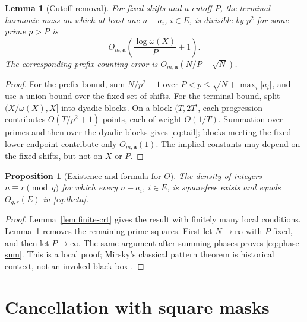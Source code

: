 \documentclass[11pt]{article}
\newtheorem{proposition}[theorem]{Proposition}
\newtheorem{lemma}[theorem]{Lemma}
\theoremstyle{definition}
\theoremstyle{remark}
\begin{document}
\begin{lemma}[Cutoff removal]
\label{lem:tail}
For fixed shifts and a cutoff \(P\), the terminal harmonic mass on which at
least one \(n-a_i\), \(i\in E\), is divisible by \(p^2\) for some prime
\(p>P\) is
\begin{equation}
 O_{m,\mathbf a}\!\left(\frac{\log\omega(X)}P+1\right).
 \label{eq:tail}
\end{equation}
The corresponding prefix counting error is
\(O_{m,\mathbf a}(N/P+\sqrt N)\).
\end{lemma}

\begin{proof}
For the prefix bound, sum \(N/p^2+1\) over
\(P<p\le\sqrt{N+\max_i|a_i|}\), and use a union bound over the fixed set
of shifts.  For the terminal bound, split \((X/\omega(X),X]\) into dyadic
blocks.  On a block \((T,2T]\), each progression contributes
\(O(T/p^2+1)\) points, each of weight \(O(1/T)\).  Summation over primes
and then over the dyadic blocks gives \eqref{eq:tail}; blocks meeting the
fixed lower endpoint contribute only \(O_{m,\mathbf a}(1)\).  The implied constants
may depend on the fixed shifts, but not on \(X\) or \(P\).
\end{proof}

\begin{proposition}[Existence and formula for \(\Theta\)]
\label{prop:theta}
The density of integers \(n\equiv r\pmod q\) for which every
\(n-a_i\), \(i\in E\), is squarefree exists and equals
\(\Theta_{q,r}(E)\) in \eqref{eq:theta}.
\end{proposition}

\begin{proof}
Lemma~\ref{lem:finite-crt} gives the result with finitely many local
conditions.  Lemma~\ref{lem:tail} removes the remaining prime squares.
First let \(N\to\infty\) with \(P\) fixed, and then let \(P\to\infty\).
The same argument after summing phases proves \eqref{eq:phase-sum}.  This
is a local proof; Mirsky's classical pattern theorem is historical context,
not an invoked black box \cite{Mirsky1948}.
\end{proof}

\section{Cancellation with square masks}
\label{sec:cancellation}
\end{document}

